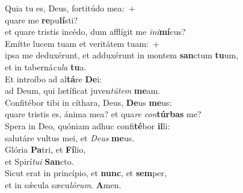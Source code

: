 \evenverse Quia tu es, Deus, fortitúdo mea:~+\\\evenverse  quare me \textbf{re}pu\textbf{lí}sti?~\*\\
\evenverse et quare tristis incédo, dum afflígit me \textit{i}\textit{ni}\textbf{mí}cus?\\
\oddverse Emítte lucem tuam et veritátem tuam:~+\\
\oddverse  ipsa me deduxérunt, et adduxérunt in montem \textbf{san}ctum \textbf{tu}um,~\*\\
\oddverse et in taberná\textit{cu}\textit{la} \textbf{tu}a.\\
\evenverse Et introíbo ad al\textbf{tá}re \textbf{De}i:~\*\\
\evenverse ad Deum, qui lætíficat juven\textit{tú}\textit{tem} \textbf{me}am.\\
\oddverse Confitébor tibi in cíthara, Deus, \textbf{De}us \textbf{me}us:~\*\\
\oddverse quare tristis es, ánima mea? et qua\textit{re} \textit{con}\textbf{túr}\textbf{bas} me?\\
\evenverse Spera in Deo, quóniam adhuc confi\textbf{té}bor \textbf{il}li:~\*\\
\evenverse salutáre vultus mei, et \textit{De}\textit{us} \textbf{me}us.\\
\oddverse Glória \textbf{Pa}tri, et \textbf{Fí}lio,~\*\\
\oddverse et Spirí\textit{tu}\textit{i} \textbf{San}cto.\\
\evenverse Sicut erat in princípio, et \textbf{nunc}, et \textbf{sem}per,~\*\\
\evenverse et in sǽcula sæcu\textit{ló}\textit{rum}. \textbf{A}men.\\
